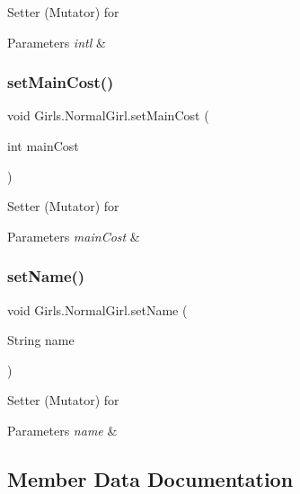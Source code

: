 Setter (Mutator) for 
\begin{DoxyParams}{Parameters}
{\em intl} & \\
\hline
\end{DoxyParams}
\mbox{\label{class_girls_1_1_normal_girl_a3015f5c6eab63af2f56e2ee50175219e}} 
\subsubsection{\texorpdfstring{set\+Main\+Cost()}{setMainCost()}}
{\footnotesize\ttfamily void Girls.\+Normal\+Girl.\+set\+Main\+Cost (\begin{DoxyParamCaption}\item[{int}]{main\+Cost }\end{DoxyParamCaption})\hspace{0.3cm}{\ttfamily [inline]}}

Setter (Mutator) for 
\begin{DoxyParams}{Parameters}
{\em main\+Cost} & \\
\hline
\end{DoxyParams}
\mbox{\label{class_girls_1_1_normal_girl_a50cbeff2c128b070e2b1ad8af1a27d9b}} 
\subsubsection{\texorpdfstring{set\+Name()}{setName()}}
{\footnotesize\ttfamily void Girls.\+Normal\+Girl.\+set\+Name (\begin{DoxyParamCaption}\item[{String}]{name }\end{DoxyParamCaption})\hspace{0.3cm}{\ttfamily [inline]}}

Setter (Mutator) for 
\begin{DoxyParams}{Parameters}
{\em name} & \\
\hline
\end{DoxyParams}


\subsection{Member Data Documentation}
\mbox{\label{class_girls_1_1_normal_girl_af2c14c384ce0b17942c5bd3c8d96a128}} 

